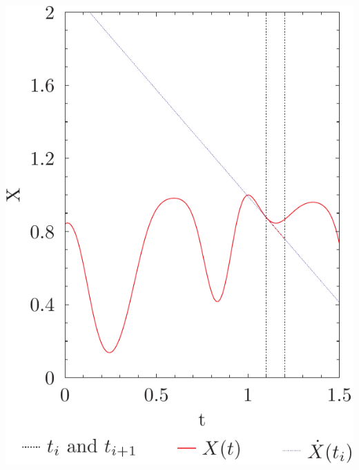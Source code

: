 \documentclass{beamer}
\begin{document}
\begin{frame}
\begin{columns}
\begin{column}{0.5\linewidth}
{\includegraphics[width=\linewidth]{euler_demo2.pdf}%
}%
\end{column}
\end{columns}
\end{frame}
\end{document}
